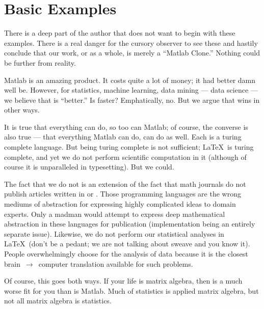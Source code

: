 
\chapter{Basic Examples}
\label{chap:basicdmat}

\vspace{0.5cm}


There is a deep part of the author that does not want to begin with these examples.  There is a real danger for the cursory observer to see these and hastily conclude that our work, or  as a whole, is merely a ``Matlab Clone.''  Nothing could be further from reality.

Matlab is an amazing product.  It costs quite a lot of money; it had better damn well be.  However, for statistics, machine learning, data mining --- data science --- we believe that  is ``better.''  Is  faster?  Emphatically, no.  But we argue that  wins in other ways.

It is true that everything  can do, so too can Matlab; of course, the converse is also true --- that everything Matlab can do,  can do as well.  Each is a turing complete language.  But being turing complete is not sufficient; \LaTeX\ is turing complete, and yet we do not perform scientific computation in it (although of course it is unparalleled in typesetting).  But we could.  

The fact that we do not is an extension of the fact that math journals do not publish articles written in  or .  Those programming languages are the wrong mediums of abstraction for expressing highly complicated ideas to domain experts.  Only a madman would attempt to express deep mathematical abstraction in these languages for publication (implementation being an entirely separate issue).  Likewise, we do not perform our statistical analyses in \LaTeX\ (don't be a pedant; we are not talking about sweave and you know it).  People overwhelmingly choose  for the analysis of data because it is the closest brain~$\rightarrow$~computer translation available for such problems.

Of course, this goes both ways.  If your life is matrix algebra, then  is a much worse fit for you than is Matlab.  Much of statistics is applied matrix algebra, but not all matrix algebra is statistics.

